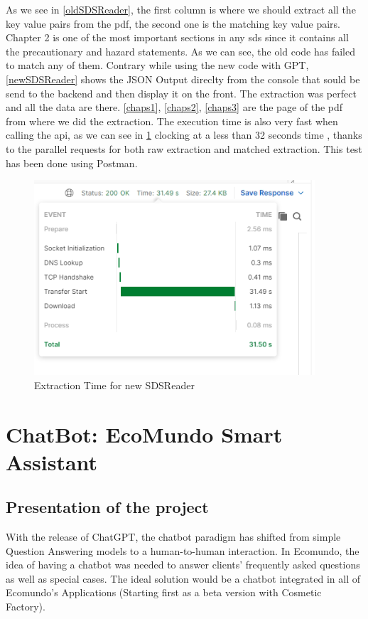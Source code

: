 \documentclass[a4paper,12pt,twoside]{report}
\begin{document}
As we see in \ref{oldSDSReader}, the first column is where we should extract all the key value pairs from the pdf, the second one is the matching key value pairs. Chapter 2 is one of the most important sections in any sds since it contains all the precautionary and hazard statements. As we can see, the old code has failed to match any of them.
Contrary while using the new code with GPT, \ref{newSDSReader} shows the JSON Output direclty from the console that sould be send to the backend and then display it on the front. The extraction was perfect and all the data are there. \ref{chaps1}, \ref{chaps2}, \ref{chaps3} are the page of the pdf from where we did the extraction.
The execution time is also very fast when calling the api, as we can see in \ref{sdsTimeResponse} clocking at a less than 32 seconds time , thanks to the parallel requests for both raw extraction and matched extraction. This test has been done using Postman.
\begin{figure}[H]
		\includegraphics[width=\textwidth, keepaspectratio ]{images/sdsTimeResponse}
	\caption[Extraction Time for new SDSReader]{Extraction Time for new SDSReader}
\label{sdsTimeResponse}
\end{figure}	

\section{ChatBot: EcoMundo Smart Assistant}\label{chatbot}
\subsection{Presentation of the project}
With the release of ChatGPT, the chatbot paradigm has shifted from simple Question Answering models to a human-to-human interaction. 
In Ecomundo, the idea of having a chatbot was needed to answer clients' frequently asked questions as well as special cases. The ideal solution would be a chatbot integrated in all of Ecomundo's Applications (Starting first as a beta version with Cosmetic Factory).
\end{document}
